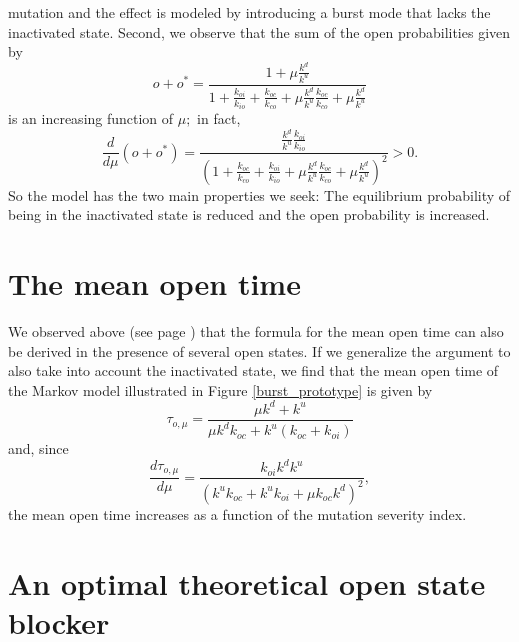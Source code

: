 mutation and the effect is modeled by introducing a burst mode that lacks the
inactivated state. Second, we observe that the sum of the open probabilities
given by
\begin{equation}
o+o^{\ast}=\frac{1+\mu\frac{k^{d}}{k^{u}}}{1+\frac{k_{oi}}{k_{io}}
+\frac{k_{oc}}{k_{co}}+\mu\frac{k^{d}}{k^{u}}\frac{k_{oc}}{k_{co}}+\mu
\frac{k^{d}}{k^{u}}}
\end{equation}
is an increasing function of $\mu;$ in fact,
\begin{equation}
\frac{d}{d\mu}\left(  o+o^{\ast}\right)  =\frac{\frac{k^{d}}{k^{u}}
\frac{k_{oi}}{k_{io}}}{\left(  1+\frac{k_{oc}}{k_{co}}+\frac{k_{oi}}{k_{io}
}+\mu\frac{k^{d}}{k^{u}}\frac{k_{oc}}{k_{co}}+\mu\frac{k^{d}}{k^{u}}\right)
^{2}}>0.
\end{equation}
So the model has the two main properties we seek: The equilibrium
probability of being in the inactivated state is reduced and the open probability
is increased.

\bigskip

\section{The mean open time}

We observed above (see page \pageref{mot_many}) that the formula for the mean open time can also
be derived in the presence of several open states. If we generalize the
argument to also take into account the inactivated state, we find that the
mean open time of the Markov model illustrated in Figure \ref{burst_prototype} is given by
\begin{equation}
\tau_{o,\mu}=\frac{\mu k^{d}+k^{u}}{\mu k^{d}k_{oc}+k^{u}\left(  k_{oc}
+k_{oi}\right)  }
\end{equation}
and, since
\begin{equation}
\frac{d\tau_{o,\mu}}{d\mu}=\frac{k_{oi}k^{d}k^{u}}{\left(  k^{u}k_{oc}+k^{u}k_{oi}+\mu k_{oc}k^{d}\right)  ^{2}},
\end{equation}
the mean open time increases as a function of the mutation severity index.


\bigskip

\section{An optimal theoretical open state blocker}

